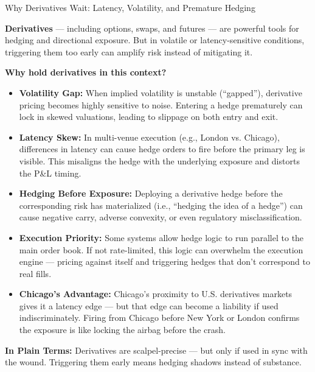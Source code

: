 \begin{TechnicalSidebar}{Why Derivatives Wait: Latency, Volatility, and Premature Hedging}

    \textbf{Derivatives} — including options, swaps, and futures — are powerful tools for hedging and directional exposure.  
    But in volatile or latency-sensitive conditions, triggering them too early can amplify risk instead of mitigating it.
    
    \medskip
    
    \textbf{Why hold derivatives in this context?}

    \medskip
    
    \begin{itemize}
      \item \textbf{Volatility Gap:}  
      When implied volatility is unstable (“gapped”), derivative pricing becomes highly sensitive to noise.  
      Entering a hedge prematurely can lock in skewed valuations, leading to slippage on both entry and exit.
    
      \item \textbf{Latency Skew:}  
      In multi-venue execution (e.g., London vs. Chicago), differences in latency can cause hedge orders to fire before the primary leg is visible.  
      This misaligns the hedge with the underlying exposure and distorts the P\&L timing.
    
      \item \textbf{Hedging Before Exposure:}  
      Deploying a derivative hedge before the corresponding risk has materialized (i.e., “hedging the idea of a hedge”) can cause negative carry, adverse convexity, or even regulatory misclassification.
    
      \item \textbf{Execution Priority:}  
      Some systems allow hedge logic to run parallel to the main order book. If not rate-limited, this logic can overwhelm the execution engine — pricing against itself and triggering hedges that don’t correspond to real fills.
    
      \item \textbf{Chicago’s Advantage:}  
      Chicago’s proximity to U.S. derivatives markets gives it a latency edge — but that edge can become a liability if used indiscriminately.  
      Firing from Chicago before New York or London confirms the exposure is like locking the airbag before the crash.
    \end{itemize}
    
    \medskip
    
    \textbf{In Plain Terms:}  
    Derivatives are scalpel-precise — but only if used in sync with the wound.  
    Triggering them early means hedging shadows instead of substance.
    
\end{TechnicalSidebar}

